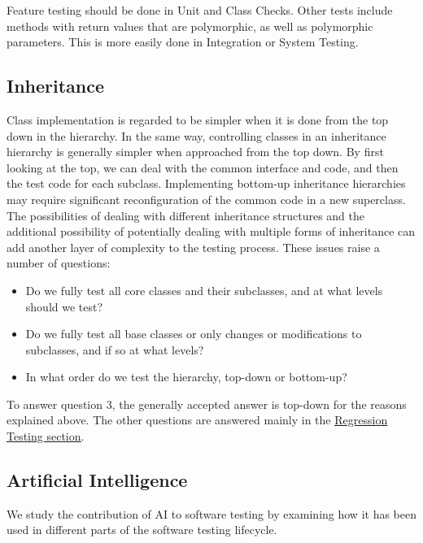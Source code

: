 \documentclass[12pt]{article}
\newcommand{\linkstyle}[1]{\color{blue}\underline{#1}}
\begin{document}
\par Feature testing should be done in Unit and Class Checks. Other tests include methods with return values that are polymorphic, as well as polymorphic parameters. This is more easily done in Integration or System Testing.

\subsection{Inheritance}

Class implementation is regarded to be simpler when it is done from the top down in the hierarchy. In the same way, controlling classes in an inheritance hierarchy is generally simpler when approached from the top down. By first looking at the top, we can deal with the common interface and code, and then the test code for each subclass. Implementing bottom-up inheritance hierarchies may require significant reconfiguration of the common code in a new superclass. The possibilities of dealing with different inheritance structures and the additional possibility of potentially dealing with multiple forms of inheritance can add another layer of complexity to the testing process. These issues raise a number of questions:

\begin{itemize}
\item Do we fully test all core classes and their subclasses, and at what levels should we test? 
\item Do we fully test all base classes or only changes or modifications to subclasses, and if so at what levels?
\item In what order do we test the hierarchy, top-down or bottom-up?
\end{itemize}

\par To answer question 3, the generally accepted answer is top-down for the reasons explained above. The other questions are answered mainly in the \newline
\hyperref[sec:Regression]{\linkstyle{Regression Testing section}}.

\subsection{Artificial Intelligence}

\par We study the contribution of AI to software testing by examining how it has been used in different parts of the software testing lifecycle.
\end{document}
